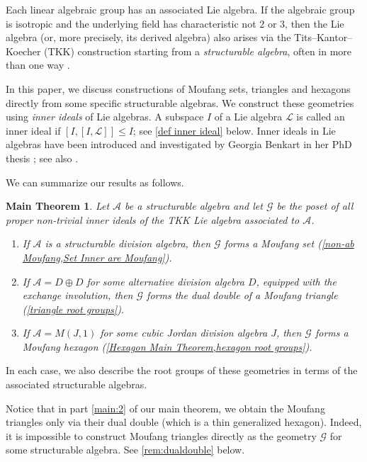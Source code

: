 \documentclass[oneside,a4paper]{amsart} %
\newcommand{\todoi}[1]{\todo[inline,color=orange!50,bordercolor=orange!50!black]{#1}}
\newtheorem*{maintheorem}{Main Theorem}
\theoremstyle{definition}
\newcommand{\A}{\mathcal{A}}
\newcommand{\LL}{\mathcal{L}}
\numberwithin{equation}{section}
\begin{document}
Each linear algebraic group has an associated Lie algebra. If the algebraic group is isotropic and the underlying field has characteristic not $2$ or $3$, then the Lie algebra (or, more precisely, its derived algebra) also arises via the Tits--Kantor--Koecher (TKK) construction starting from a \emph{structurable algebra}, often in more than one way \cite[Theorem 5.9]{Stavrova2017}.%

In this paper, we discuss constructions of Moufang sets, triangles and hexagons directly from some specific structurable algebras. 
We construct these geometries using \emph{inner ideals} of Lie algebras.
A subspace $I$ of a Lie algebra $\LL$ is called an inner ideal if $[I, [I, \LL]] \leq I$; see \cref{def inner ideal} below.
Inner ideals in Lie algebras have been introduced and investigated by Georgia Benkart in her PhD thesis \cite{Benkart1974}; see also \cite{Benkart1977}.

We can summarize our results as follows. %
\begin{maintheorem}
Let $\A$ be a structurable algebra and let $\mathcal{G}$ be the poset of all proper non-trivial inner ideals of the TKK Lie algebra associated to $\A$.
\begin{enumerate}
    \item\label{main:1} If $\A$ is a structurable division algebra, then $\mathcal{G}$ forms a Moufang set (\cref{non-ab Moufang,Set Inner are Moufang}).
    \item\label{main:2} If $\A = D \oplus D$ for some alternative division algebra $D$, equipped with the exchange involution, then $\mathcal{G}$ forms the dual double of a Moufang triangle (\cref{triangle root groups}). 
    \item\label{main:3} If $\A = M(J, 1)$ for some cubic Jordan division algebra $J$, then $\mathcal{G}$ forms a Moufang hexagon (\cref{Hexagon Main Theorem,hexagon root groups}).
\end{enumerate}
\end{maintheorem}

In each case, we also describe the root groups of these geometries in terms of the associated structurable algebras.

Notice that in part \cref{main:2} of our main theorem, we obtain the Moufang triangles only via their dual double (which is a thin generalized hexagon). Indeed, it is impossible to construct Moufang triangles directly as the geometry $\mathcal{G}$ for some structurable algebra.
See \cref{rem:dualdouble} below.
\end{document}
